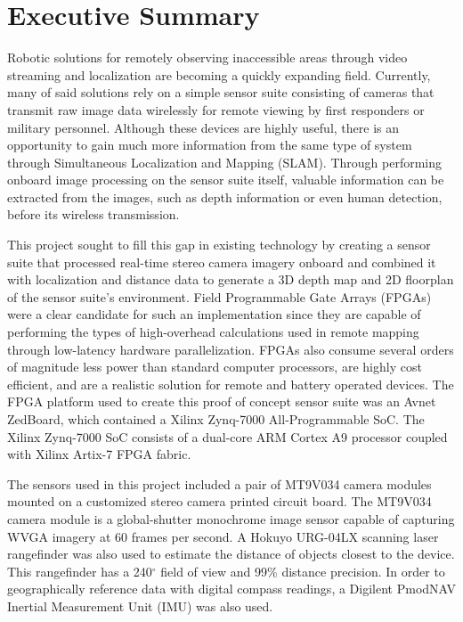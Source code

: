 {}
\section*{Executive Summary}
Robotic solutions for remotely observing inaccessible areas through video streaming and localization are becoming a quickly expanding field. Currently, many of said solutions rely on a simple sensor suite consisting of cameras that transmit raw image data wirelessly for remote viewing by first responders or military personnel. Although these devices are highly useful, there is an opportunity to gain much more information from the same type of system through Simultaneous Localization and Mapping (SLAM). Through performing onboard image processing on the sensor suite itself, valuable information can be extracted from the images, such as depth information or even human detection, before its wireless transmission.
\par
This project sought to fill this gap in existing technology by creating a sensor suite that processed real-time stereo camera imagery onboard and combined it with localization and distance data to generate a 3D depth map and 2D floorplan of the sensor suite's environment. Field Programmable Gate Arrays (FPGAs) were a clear candidate for such an implementation since they are capable of performing the types of high-overhead calculations used in remote mapping through low-latency hardware parallelization. FPGAs also consume several orders of magnitude less power than standard computer processors, are highly cost efficient, and are a realistic solution for remote and battery operated devices. The FPGA platform used to create this proof of concept sensor suite was an Avnet ZedBoard, which contained a Xilinx Zynq-7000 All-Programmable SoC. The Xilinx Zynq-7000 SoC consists of a dual-core ARM Cortex A9 processor coupled with Xilinx Artix-7 FPGA fabric.
\par
The sensors used in this project included a pair of MT9V034 camera modules mounted on a customized stereo camera printed circuit board. The MT9V034 camera module is a global-shutter monochrome image sensor capable of capturing WVGA imagery at 60 frames per second. A Hokuyo URG-04LX scanning laser rangefinder was also used to estimate the distance of objects closest to the device. This rangefinder has a 240$^\circ$ field of view and 99\% distance precision. In order to geographically reference data with digital compass readings, a Digilent PmodNAV Inertial Measurement Unit (IMU) was also used. 
